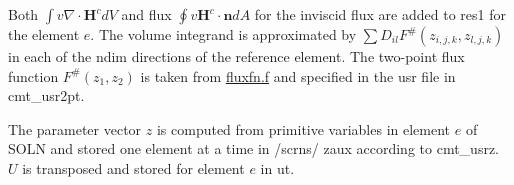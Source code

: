 Both $\int v \nabla\cdot\mathbf{H}^c dV$ and flux $\oint v \mathbf{H}^c\cdot\mathbf{n} dA$ for the inviscid flux are added to res1 for the element $e$. The volume integrand is approximated by $\sum D_{il} F^{\#}(z_{i,j,k},z_{l,j,k})$ in each of the ndim directions of the reference element. The two-\/point flux function $F^{\#}(z_1,z_2)$ is taken from \hyperlink{fluxfn_8f}{fluxfn.\-f} and specified in the usr file in cmt\-\_\-usr2pt.

The parameter vector $z$ is computed from primitive variables in element $e$ of S\-O\-L\-N and stored one element at a time in /scrns/ zaux according to cmt\-\_\-usrz. $U$ is transposed and stored for element $e$ in ut.